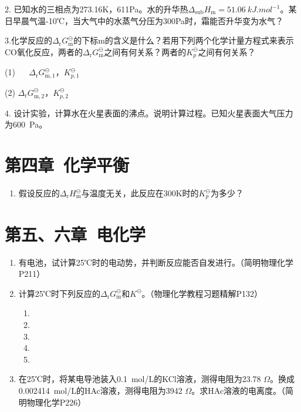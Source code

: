 \documentclass[cn,blue,14pt,normal]{elegantnote}
\begin{document}
2. 已知水的三相点为273.16K，611Pa。水的升华热$\Delta_\mathrm{sub}H_\mathrm{m}=\SI{51.06}{kJ.mol^{-1}}$。某日早晨气温-10℃，当大气中的水蒸气分压为300Pa时，霜能否升华变为水气？

\bigskip
3.化学反应的$\Delta_\mathrm{r}G_\mathrm{m}^\ominus$的下标m的含义是什么？若用下列两个化学计量方程式来表示CO氧化反应，两者的$\Delta_\mathrm{r}G_\mathrm{m}^\ominus$之间有何关系？两者的$K_p^\ominus$之间有何关系？

(1)  \qquad ~~ $\Delta_\mathrm{r}G_\mathrm{m,1}^\ominus$，$K_{p,1}^\ominus$

(2)  \qquad $\Delta_\mathrm{r}G_\mathrm{m,2}^\ominus$，$K_{p,2}^\ominus$
\bigskip

4. 设计实验，计算水在火星表面的沸点。说明计算过程。已知火星表面大气压力为\SI{600}{Pa}。

\section*{第四章\ 化学平衡}

\begin{enumerate}
  \item 假设反应的$\Delta_\mathrm{r}H_\mathrm{m}^\ominus$与温度无关，此反应在300K时的$K_p^\ominus$为多少？
\end{enumerate}



\section*{第五、六章\ 电化学}
\begin{enumerate}
  \item 有电池，试计算25℃时的电动势，并判断反应能否自发进行。（简明物理化学P211）
  \item 计算25℃时下列反应的$\Delta_\mathrm{r}G_\mathrm{m}^\ominus$和$K^\ominus$。（物理化学教程习题精解P132）
		\begin{enumerate}
		  \item {}
		  \item {}
		  \item {}
		  \item {}
		  \item {}
		\end{enumerate}
  \item 在25℃时，将某电导池装入\SI{0.1}{mol/L}的KCl溶液，测得电阻为23.78 $\Omega$。换成\SI{0.002414}{mol/L}的HAc溶液，测得电阻为3942 $\Omega$。求HAc溶液的电离度。（简明物理化学P226）
\end{enumerate}
\end{document}
